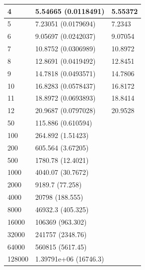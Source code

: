 \documentclass{beamer}
\begin{document}
\begin{frame}
\begin{columns}
\begin{column}[]{.5\textwidth}
\begin{table}
\begin{tabular}{|l|l|l|}
					4&5.54665 (0.0118491)& 5.55372\\ \hline
					5&7.23051 (0.0179694)& 7.2343\\ \hline
					6&9.05697 (0.0242037)& 9.07054\\ \hline
					7&10.8752 (0.0306989)& 10.8972\\ \hline
					8&12.8691 (0.0419492)& 12.8451\\ \hline
					9&14.7818 (0.0493571)& 14.7806\\ \hline
					10&16.8283 (0.0578437)& 16.8172\\ \hline
					11&18.8972 (0.0693893)& 18.8414\\ \hline
					12&20.9687 (0.0797028)& 20.9528\\ \hline
					50&115.886 (0.610594)&\\ \hline
					100&264.892 (1.51423)&\\ \hline
					200&605.564 (3.67205)&\\ \hline
					500&1780.78 (12.4021)&\\ \hline
					1000&4040.07 (30.7672)&\\ \hline
					2000&9189.7 (77.258)&\\ \hline
					4000&20798 (188.555)&\\ \hline
					8000&46932.3 (405.325)&\\ \hline
					16000&106369 (963.302)&\\ \hline
					32000&241757 (2348.76)&\\ \hline
					64000&560815 (5617.45)&\\ \hline
					128000&1.39791e+06 (16746.3)&\\ \hline
				\end{tabular}
			\end{table}
		\end{column}
	\end{columns}
\end{frame}
\end{document}
